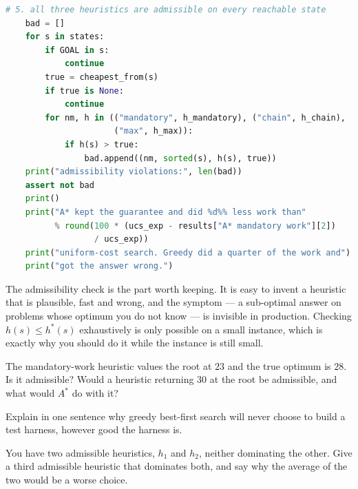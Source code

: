 \begin{lab}
\begin{lstlisting}[language=Python]
    # 5. all three heuristics are admissible on every reachable state
    bad = []
    for s in states:
        if GOAL in s:
            continue
        true = cheapest_from(s)
        if true is None:
            continue
        for nm, h in (("mandatory", h_mandatory), ("chain", h_chain),
                      ("max", h_max)):
            if h(s) > true:
                bad.append((nm, sorted(s), h(s), true))
    print("admissibility violations:", len(bad))
    assert not bad
    print()
    print("A* kept the guarantee and did %d%% less work than"
          % round(100 * (ucs_exp - results["A* mandatory work"][2])
                  / ucs_exp))
    print("uniform-cost search. Greedy did a quarter of the work and")
    print("got the answer wrong.")
\end{lstlisting}
The admissibility check is the part worth keeping. It is easy to invent a heuristic
that is plausible, fast and wrong, and the symptom --- a sub-optimal answer on
problems whose optimum you do not know --- is invisible in production. Checking
$h(s) \le h^{*}(s)$ exhaustively is only possible on a small instance, which is
exactly why you should do it while the instance is still small.
\end{lab}

\begin{checkpoint}
\begin{tightnum}
  \item The mandatory-work heuristic values the root at $23$ and the true optimum is
        $28$. Is it admissible? Would a heuristic returning $30$ at the root be
        admissible, and what would $A^{*}$ do with it?
  \item Explain in one sentence why greedy best-first search will never choose to
        build a test harness, however good the harness is.
  \item You have two admissible heuristics, $h_{1}$ and $h_{2}$, neither
        dominating the other. Give a third admissible heuristic that dominates both,
        and say why the average of the two would be a worse choice.
\end{tightnum}
\end{checkpoint}

